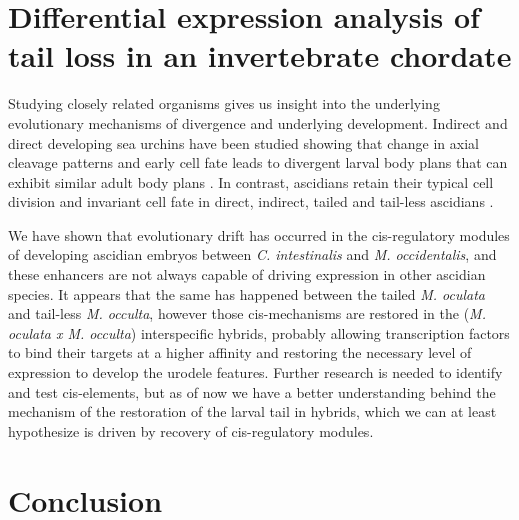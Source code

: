 \section{Differential expression analysis of tail loss in an invertebrate chordate}
Studying closely related organisms gives us insight into the underlying evolutionary mechanisms of divergence and underlying development. Indirect and direct developing sea urchins have been studied showing that change in axial cleavage patterns and early cell fate leads to divergent larval body plans that can exhibit similar adult body plans \cite{wray_evolutionary_1989,henry_evolutionary_1990}. In contrast, ascidians retain their typical cell division and invariant cell fate in direct, indirect, tailed and tail-less ascidians \cite{jeffery_evolutionary_1991,maliska_molgula_2010}. %
   
We have shown that evolutionary drift has occurred in the cis-regulatory modules of developing ascidian embryos between \textit{C. intestinalis} and \textit{M. occidentalis}, and these enhancers are not always capable of driving expression in other ascidian species. It appears that the same has happened between the tailed \textit{M. oculata} and tail-less \textit{M. occulta}, however those cis-mechanisms are restored in the (\textit{M. oculata x M. occulta}) interspecific hybrids, probably allowing transcription factors to bind their targets at a higher affinity and restoring the necessary level of expression to develop the urodele features. Further research is needed to identify and test cis-elements, but as of now we have a better understanding behind the mechanism of the restoration of the larval tail in hybrids, which we can at least hypothesize is driven by recovery of cis-regulatory modules.

\section{Conclusion}

